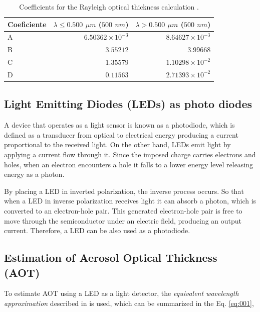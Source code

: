 \documentclass[12pt,letterpaper]{article}
\numberwithin{figure}{section}
\numberwithin{equation}{section}
\numberwithin{table}{section}
\begin{document}
\begin{table}[H]
\centering
\caption{ Coefficients for the Rayleigh optical thickness calculation \cite{Bucholtz}.}
\label{tab:1}
\begin{tabular}{|l|r|r|}
\hline
Coeficiente & \multicolumn{1}{l|}{$\lambda\leq0.500$ $\mu m$ ($500$ $nm$)} & \multicolumn{1}{l|}{$\lambda>0.500$ $\mu m$ ($500$ $nm$)} \\ \hline
A & $6.50362\times10^{-3}$ & $8.64627\times10^{-3}$  \\ \hline
B & $3.55212$              & $3.99668$               \\ \hline
C & $1.35579$              & $1.10298\times10^{-2}$  \\ \hline
D & $0.11563$              & $2.71393\times10^{-2}$  \\ \hline
\end{tabular}
\end{table}

\subsection{Light Emitting Diodes (LEDs) as photo diodes}

A device that operates as a light sensor is known as a photodiode, which is defined as a transducer from optical to electrical energy producing a current proportional to the received light. On the other hand, LEDs emit light by applying a current flow through it. Since the imposed charge carries electrons and holes, when an electron encounters a hole it falls to a lower energy level releasing energy as a photon.

By placing a LED in inverted polarization, the inverse process occurs. So that when a LED in inverse polarization receives light it can absorb a photon, which is converted to an electron-hole pair. This generated electron-hole pair is free to move through the semiconductor under an electric field, producing an output current. Therefore, a LED can be also used as a photodiode.

\subsection{Estimation of Aerosol Optical Thickness (AOT)}

To estimate AOT using a LED as a light detector, the \textit{equivalent wavelength approximation} described in \cite{BrooksMims} is used, which can be summarized in the Eq. \ref{eq:001},
\end{document}
